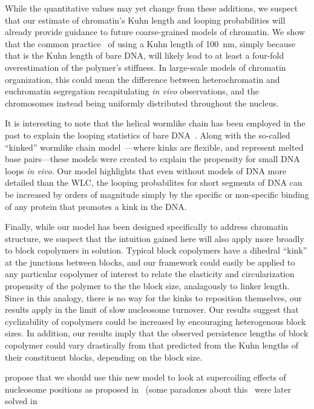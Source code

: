 \documentclass[%
 reprint,
superscriptaddress,
showpacs,preprintnumbers,
 amsmath,amssymb,
 aps,
 prl,
]{revtex4-1}
\begin{document}
While the quantitative values may yet change from these additions, we suspect that our estimate of chromatin's Kuhn length and looping probabilities will already provide
    guidance to future coarse-grained models of chromatin.
We show that the common practice~\cite{macphersonInPress,nuebler2018}
    of using a Kuhn length of \SI{100}{\nano\metre}, simply because that is the
    Kuhn length of bare DNA, will likely lead to at least a four-fold
    overestimation of the polymer's stiffness. %
In large-scale models of chromatin organization, this could mean the difference
    between heterochromatin and euchromatin segregation recapitulating
    \textit{in vivo} observations, and the chromosomes instead being uniformly
    distributed throughout the nucleus.

It is interesting to note that the helical wormlike chain has been employed
    in the past to explain the looping statistics of bare DNA~\cite{shimada1984,
    liu2011a}.
Along with the so-called ``kinked'' wormlike chain model~\cite{wiggins2005,
    popov2005}---where kinks are flexible, and represent melted base
    pairs---these models were created to explain the propensity for small DNA
    loops \textit{in vivo}.
Our model highlights that even without models of DNA more detailed than the WLC,
    the looping probabilites for short segments of DNA can be increased by
    orders of magnitude simply by the specific or non-specific binding of any
    protein that promotes a kink in the DNA.\@

Finally, while our model has been designed specifically to address chromatin
    structure, we suspect that the intuition gained here will also apply more
    broadly to block copolymers in solution.
Typical block copolymers have a dihedral ``kink'' at the junctions between
    blocks, and our framework could easily be applied to any particular
    copolymer of interest to relate the elasticity and circularization
    propensity of the polymer to the the block size, analagously to linker
    length.
Since in this analogy, there is no way for the kinks to reposition themselves,
    our results apply in the limit of slow nucleosome turnover.
Our results suggest that cyclizability of copolymers could be increased by
    encouraging heterogenous block sizes.
In addition, our results imply that the observed persistence lengths of block
    copolymer could vary drastically from that predicted from the Kuhn lengths
    of their constituent blocks, depending on the block size.

propose that we should use this new model to look at supercoiling effects
of nucleosome positions as proposed in~\cite{grigoryev1981} (some paradoxes
about this~\cite{prunell1998} were later solved in~\cite{nikitina2017}
\end{document}
